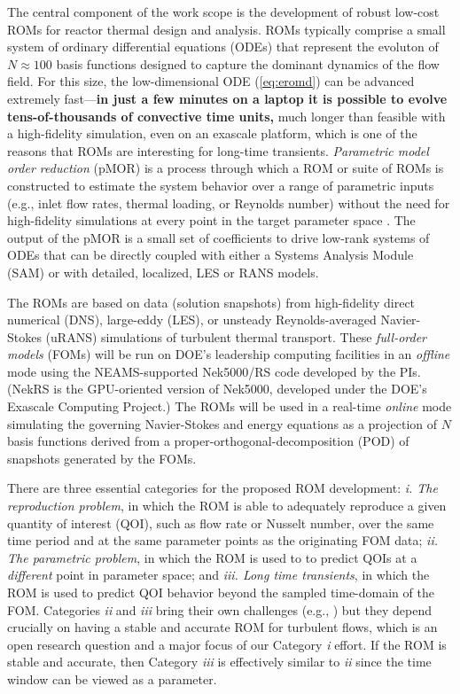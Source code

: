 
The central component of the work scope is the development of robust low-cost
ROMs for reactor thermal design and analysis.  ROMs typically comprise a small
system of ordinary differential equations (ODEs) that represent the evoluton of
$N \approx 100$ basis functions designed to capture the dominant dynamics of
the flow field.  For this size, the low-dimensional ODE (\ref{eq:eromd}) can
   be advanced extremely fast---\textbf{in just a few minutes on a laptop it is
   possible to evolve tens-of-thousands of convective time units,} much longer
   than feasible with a high-fidelity simulation, even on an exascale platform,
   which is one of the reasons that ROMs are interesting for long-time transients.  
{\em Parametric model order reduction} (pMOR) is a process through which
a ROM or suite of ROMs is constructed to estimate the system behavior 
over a range of parametric inputs (e.g., inlet flow rates, thermal loading,
or Reynolds number)
without the need for high-fidelity simulations at every point in the target
parameter space \cite{fick18,tsai22a}.  The output of the pMOR is a small
set of coefficients to drive low-rank systems of ODEs that can be directly
coupled with either a Systems Analysis Module (SAM) or with detailed,
localized, LES or RANS models.

The ROMs are based on data (solution snapshots) from high-fidelity direct
numerical (DNS), large-eddy (LES), or unsteady Reynolds-averaged Navier-Stokes
(uRANS) simulations of turbulent thermal transport.   These \textit{full-order
models} (FOMs) will be run on DOE's leadership computing facilities in an {\em
offline} mode using the NEAMS-supported Nek5000/RS code developed by the PIs.
(NekRS is the GPU-oriented version of Nek5000, developed under the DOE's
Exascale Computing Project.) The ROMs will be used in a real-time {\em online}
mode simulating the governing Navier-Stokes and energy equations as a
projection of $N$ basis functions derived from a
proper-orthogonal-decomposition (POD) of snapshots generated by the FOMs.

There are three essential categories for the proposed ROM development:
\textit{i. The reproduction problem}, in which the ROM is able to
adequately reproduce a given quantity of interest (QOI), such as
flow rate or Nusselt number, over the same time period and at the
same parameter points as the originating FOM data;
\textit{ii. The parametric problem}, in which the ROM is used to
to predict QOIs at a {\em different} point in parameter space;
and
\textit{iii. Long time transients}, in which the ROM is used to
predict QOI behavior beyond the sampled time-domain of the FOM.
Categories \textit{ii} and \textit{iii} bring their own challenges
(e.g., \cite{tsai22a}) but they depend crucially on having a 
stable and accurate ROM for turbulent flows, which is an open
research question and a major focus of our Category \textit{i} effort.
If the ROM is stable and accurate, then Category \textit{iii} is 
effectively similar to \textit{ii} since the time window can be
viewed as a parameter.

